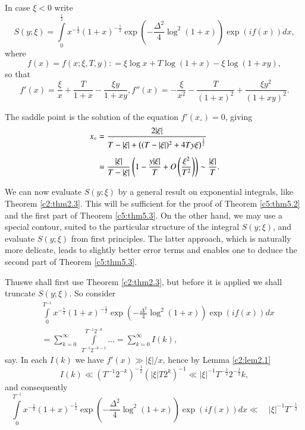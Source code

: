 In case $\xi  < 0$ write
$$ 
S(y;\xi) = \int\limits^{\frac{1}{2}}_0 x^{-\frac{1}{2}}
(1+x)^{-\frac{1}{2}} \exp \left(-\frac{\Delta^2}{4} \log^2 (1+x)
\right) \exp (if  (x)) dx, 
$$
where 
$$
f(x) = f(x;\xi, T, y): = \xi \log x + T \log (1+x) - \xi \log (1+ xy),  
$$
so that 
$$
f'(x) = \frac{\xi}{x} + \frac{T}{1+x} - \frac{\xi y}{1+ xy} , f''(x) =
-\frac{\xi}{x^2} -\frac{T}{(1+x)^2} + \frac{\xi y^2}{ (1+ xy)^2}. 
$$

The saddle point is the solution of the equation $f'(x_\circ) = 0$, giving
\begin{align}
x_\circ & = \frac{2|\xi|}{T - |\xi| + \left((T - |\xi|)^2 + 4 T
  y\xi\right)^{\frac{1}{2}}}\notag\\[5pt] 
& = \frac{|\xi|}{T -|\xi|} \left(1 -\frac{y|\xi|}{T} + O
\left(\frac{\xi^2}{T^2}\right)\right)  \sim
\frac{|\xi|}{T}.\label{c5:eq5.145} 
\end{align}

We can now evaluate $S(y;\xi)$ by a general result on exponential
integrals, like Theorem \ref{c2:thm2.3}. This will be sufficient for
the proof of Theorem \ref{c5:thm5.2} and the first part of Theorem
\ref{c5:thm5.3}. On the other hand, we may use a special contour,
suited to the particular structure of the integral $S(y;\xi)$, and
evaluate $S(y;\xi)$ from first principles. The latter approach, which
is naturally more delicate, leads to slightly better error terms and
enables one to deduce the second part of Theorem \ref{c5:thm5.3}.  

Thus\pageoriginale we shall first use Theorem \ref{c2:thm2.3}, but
before it is applied we shall truncate $S(y;\xi)$. So consider 
\begin{align*}
& \int\limits^{T^{-1}}_0 x^{-\frac{1}{2}} (1+x)^{-\frac{1}{2}} \exp
  \left(-\frac{\Delta^2}{4} \log^2 (1+x) \right) \exp  (if (x)) dx\\ 
& =  \sum\limits^\infty_{k=0} \ \int\limits^{T^{-1} 2^{-k}}_{T^{-1}
    2^{-k-1}} \ldots  = \sum\limits^\infty_{k=0} I(k), 
\end{align*}
say. In each $I(k)$ we have $f'(x) \gg |\xi| /x$, hence by Lemma
\ref{c2:lem2.1} 
$$
I(k) \ll (T^{-1} 2^{-k})^{-\frac{1}{2}} (|\xi| T2^k)^{-1} \ll
|\xi|^{-1} T^{-\frac{1}{2}} 2^{-\frac{1}{2}} k, 
$$
and consequently
$$
\int\limits^{T^{-1}}_0 x^{-\frac{1}{2}} (1+x)^{-\frac{1}{2}} \exp
\left(-\frac{\Delta^2}{4} \log^2 (1+x)\right) \exp (if(x)) dx \ll
\quad |\xi|^{-1} T^{-\frac{1}{2}} 
$$

